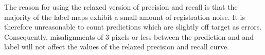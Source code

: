 The reason for using the relaxed version of precision and recall is that the majority of the label maps exhibit a small amount of registration noise. It is therefore unreasonable to count predictions which are slightly off target as errors. Consequently, misalignments of 3 pixels or less between the prediction and and label will not affect the values of the relaxed precision and recall curve.\\



